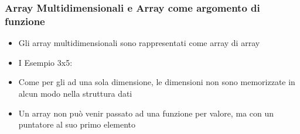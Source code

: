 \subsubsection{Array Multidimensionali e Array come argomento di funzione}
\begin{itemize}
    \item Gli array multidimensionali sono rappresentati come array
    di array
    \item I Esempio 3x5:
    
    \item  Come per gli  ad una sola dimensione, le
    dimensioni non sono memorizzate in alcun modo nella
    struttura dati 
    \item Un array non può venir passato ad una funzione per
    valore, ma con un puntatore al suo primo elemento
    
\end{itemize}

